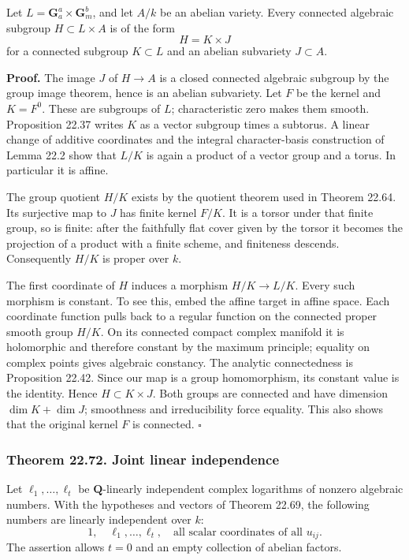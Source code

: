 \documentclass[
  11pt,
  a4paper,
]{article}
\begin{document}
Let \(L=\mathbf G_a^a\times\mathbf G_m^b\), and let \(A/k\) be an
abelian variety. Every connected algebraic subgroup
\(H\subset L\times A\) is of the form \[
 H=K\times J
 \tag{22.176}
\] for a connected subgroup \(K\subset L\) and an abelian subvariety
\(J\subset A\).

\textbf{Proof.} The image \(J\) of \(H\to A\) is a closed connected
algebraic subgroup by the group image theorem, hence is an abelian
subvariety. Let \(F\) be the kernel and \(K=F^0\). These are subgroups
of \(L\); characteristic zero makes them smooth. Proposition 22.37
writes \(K\) as a vector subgroup times a subtorus. A linear change of
additive coordinates and the integral character-basis construction of
Lemma 22.2 show that \(L/K\) is again a product of a vector group and a
torus. In particular it is affine.

The group quotient \(H/K\) exists by the quotient theorem used in
Theorem 22.64. Its surjective map to \(J\) has finite kernel \(F/K\). It
is a torsor under that finite group, so is finite: after the faithfully
flat cover given by the torsor it becomes the projection of a product
with a finite scheme, and finiteness descends. Consequently \(H/K\) is
proper over \(k\).

The first coordinate of \(H\) induces a morphism \(H/K\to L/K\). Every
such morphism is constant. To see this, embed the affine target in
affine space. Each coordinate function pulls back to a regular function
on the connected proper smooth group \(H/K\). On its connected compact
complex manifold it is holomorphic and therefore constant by the maximum
principle; equality on complex points gives algebraic constancy. The
analytic connectedness is Proposition 22.42. Since our map is a group
homomorphism, its constant value is the identity. Hence
\(H\subset K\times J\). Both groups are connected and have dimension
\(\dim K+\dim J\); smoothness and irreducibility force equality. This
also shows that the original kernel \(F\) is connected. \(\square\)

\subsubsection{Theorem 22.72. Joint linear
independence}\label{theorem-22.72.-joint-linear-independence}

Let \(\ell_1,\ldots,\ell_t\) be \(\mathbf Q\)-linearly independent
complex logarithms of nonzero algebraic numbers. With the hypotheses and
vectors of Theorem 22.69, the following numbers are linearly independent
over \(k\): \[
 1,\quad \ell_1,\ldots,\ell_t,\quad
 \text{all scalar coordinates of all }u_{ij}.
 \tag{22.177}
\] The assertion allows \(t=0\) and an empty collection of abelian
factors.
\end{document}
